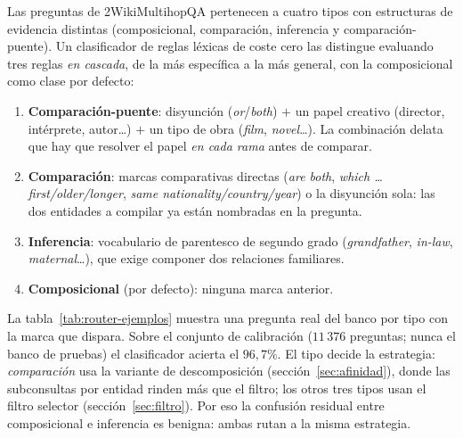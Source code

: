 \documentclass[11pt,a4paper]{article}
\begin{document}
Las preguntas de 2WikiMultihopQA pertenecen a cuatro tipos con estructuras
de evidencia distintas (composicional, comparación, inferencia y
comparación-puente). Un clasificador de reglas léxicas de coste cero las
distingue evaluando tres reglas \emph{en cascada}, de la más específica a
la más general, con la composicional como clase por defecto:
\begin{enumerate}[leftmargin=1.6em, itemsep=1pt]
\item \textbf{Comparación-puente}: disyunción (\emph{or}/\emph{both})
  $+$ un papel creativo (director, intérprete, autor\dots) $+$ un tipo de
  obra (\emph{film}, \emph{novel}\dots). La combinación delata que hay que
  resolver el papel \emph{en cada rama} antes de comparar.
\item \textbf{Comparación}: marcas comparativas directas
  (\emph{are both}, \emph{which \dots first/older/longer},
  \emph{same nationality/country/year}) o la disyunción sola: las dos
  entidades a compilar ya están nombradas en la pregunta.
\item \textbf{Inferencia}: vocabulario de parentesco de segundo grado
  (\emph{grandfather}, \emph{in-law}, \emph{maternal}\dots), que exige
  componer dos relaciones familiares.
\item \textbf{Composicional} (por defecto): ninguna marca anterior.
\end{enumerate}
La tabla~\ref{tab:router-ejemplos} muestra una pregunta real del banco por
tipo con la marca que dispara. Sobre el conjunto de calibración
($11\,376$ preguntas; nunca el banco de pruebas) el clasificador acierta
el $96{,}7\%$. El tipo decide la estrategia: \emph{comparación} usa la
variante de descomposición (sección~\ref{sec:afinidad}), donde las
subconsultas por entidad rinden más que el filtro; los otros tres tipos
usan el filtro selector (sección~\ref{sec:filtro}). Por eso la confusión
residual entre composicional e inferencia es benigna: ambas rutan a la
misma estrategia.
\end{document}
